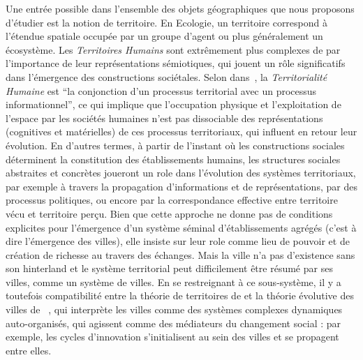 {}{
Une entrée possible dans l'ensemble des objets géographiques que nous proposons d'étudier est la notion de territoire.
 En Ecologie, un territoire correspond à l'étendue spatiale occupée par un groupe d'agent ou plus généralement un écosystème. Les \emph{Territoires Humains} sont extrêmement plus complexes de par l'importance de leur représentations sémiotiques, qui jouent un rôle significatifs dans l'émergence des constructions sociétales.
  Selon  dans~\cite{raffestin1988reperes}, la \emph{Territorialité Humaine} est ``la conjonction d'un processus territorial avec un processus informationnel'', ce qui implique que l'occupation physique et l'exploitation de l'espace par les sociétés humaines n'est pas dissociable 
   des représentations (cognitives et matérielles) de ces processus territoriaux, qui influent en retour leur évolution. En d'autres termes, à partir de l'instant où les constructions sociales déterminent la constitution des établissements humains, les structures sociales abstraites et concrètes joueront un role dans l'évolution des systèmes territoriaux, par exemple à travers la propagation d'informations et de représentations, par des processus politiques, ou encore par la correspondance effective entre territoire vécu et territoire perçu.  
    Bien que cette approche ne donne pas de conditions explicites pour l'émergence d'un système séminal d'établissements agrégés (c'est à dire l'émergence des villes), 
     elle insiste sur leur role comme lieu de pouvoir et de création de richesse au travers des échanges. Mais la ville n'a pas d'existence sans son hinterland et le système territorial peut difficilement être résumé par ses villes, comme un système de villes. En se restreignant à ce sous-système, il y a toutefois compatibilité entre la théorie de territoires de  et la théorie évolutive des villes de ~\cite{pumain2010theorie}, qui interprète les villes comme des systèmes complexes dynamiques auto-organisés, qui agissent comme des médiateurs du changement social : par exemple, les cycles d'innovation s'initialisent au sein des villes et se propagent entre elles.  
}
